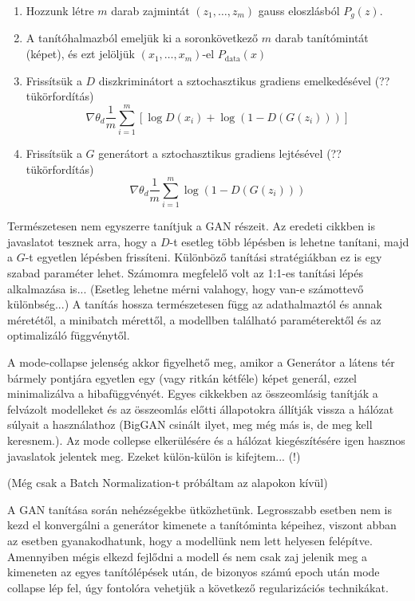 \begin{enumerate}
	\item Hozzunk létre $m$ darab zajmintát $(z_1, \ldots, z_m)$ gauss eloszlásból $P_g(z)$.
	\item A tanítóhalmazból emeljük ki a soronkövetkező $m$ darab tanítómintát (képet), és ezt jelöljük $(x_1, \ldots, x_m)$-el $P_{\text{data}}(x)$
	\item Frissítsük a $D$ diszkriminátort a sztochasztikus gradiens emelkedésével (?? tükörfordítás)
$$ \nabla \theta_d \frac{1}{m} \sum_{i=1}^{m} \left[\log D(x_i) + \log(1 - D(G(z_i))) \right]$$
	\item Frissítsük a $G$ generátort a sztochasztikus gradiens lejtésével (?? tükörfordítás)
$$ \nabla \theta_d \frac{1}{m} \sum_{i=1}^{m} \log(1 - D(G(z_i)))$$
\end{enumerate}
Természetesen nem egyszerre tanítjuk a GAN részeit. Az eredeti cikkben is javaslatot tesznek arra, hogy a $D$-t esetleg több lépésben is lehetne tanítani, majd a $G$-t egyetlen lépésben frissíteni.
Különböző tanítási stratégiákban ez is egy szabad paraméter lehet. Számomra megfelelő volt az 1:1-es tanítási lépés alkalmazása is... (Esetleg lehetne mérni valahogy, hogy van-e számottevő különbség...)
A tanítás hossza természetesen függ az adathalmaztól és annak méretétől, a minibatch mérettől, a modellben található paraméterektől és az optimalizáló függvénytől.

A mode-collapse jelenség akkor figyelhető meg, amikor a Generátor a látens tér bármely pontjára egyetlen egy (vagy ritkán kétféle) képet generál, ezzel minimalizálva a hibafüggvényét.
Egyes cikkekben az összeomlásig tanítják a felvázolt modelleket és az összeomlás előtti állapotokra állítják vissza a hálózat súlyait a használathoz (BigGAN csinált ilyet, meg még más is, de meg kell keresnem.). Az mode collepse elkerülésére és a hálózat kiegészítésére igen hasznos javaslatok jelentek meg. Ezeket külön-külön is kifejtem... (!)

(Még csak a Batch Normalization-t próbáltam az alapokon kívül)

A GAN tanítása során nehézségekbe ütközhetünk. Legrosszabb esetben nem is kezd el konvergálni a generátor kimenete a tanítóminta képeihez, viszont abban az esetben gyanakodhatunk, hogy a modellünk nem lett helyesen felépítve. Amennyiben mégis elkezd fejlődni a modell és nem csak zaj jelenik meg a kimeneten az egyes tanítólépések után, de bizonyos számú epoch után mode collapse lép fel, úgy fontolóra vehetjük a következő regularizációs technikákat.

